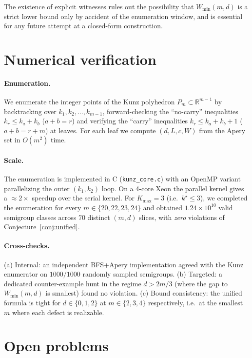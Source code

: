 \documentclass[11pt,a4paper]{article}
\begin{document}
The existence of explicit witnesses rules out the possibility that
$W_{\min}(m,d)$ is a strict lower bound only by accident of the
enumeration window, and is essential for any future attempt at a
closed-form construction.

\section{Numerical verification}
\label{sec:num}

\paragraph{Enumeration.}
We enumerate the integer points of the Kunz polyhedron
$P_m \subset \mathbb{R}^{m-1}$ by backtracking over
$k_1, k_2, ..., k_{m-1}$, forward-checking the ``no-carry''
inequalities $k_r \le k_a + k_b$ ($a+b = r$) and verifying the
``carry'' inequalities $k_r \le k_a + k_b + 1$ ($a+b = r+m$) at
leaves. For each leaf we compute $(d, L, c, W)$ from the
Apery set in $O(m^2)$ time.

\paragraph{Scale.}
The enumeration is implemented in C (\texttt{kunz\_core.c}) with
an OpenMP variant parallelizing the outer
$(k_1, k_2)$ loop. On a 4-core Xeon the parallel kernel gives
a $\approx 2\times$ speedup over the serial kernel. For
$K_{\max} = 3$ (i.e.\ $k^\star \le 3$), we completed the
enumeration for every $m \in \{20, 22, 23, 24\}$ and obtained
$1.24 \times 10^{10}$ valid semigroup classes across
$70$ distinct $(m,d)$ slices, with \emph{zero} violations of
Conjecture~\ref{conj:unified}.

\paragraph{Cross-checks.}
(a) Internal: an independent BFS+Apery implementation agreed with
the Kunz enumerator on $1000/1000$ randomly sampled semigroups.
(b) Targeted: a dedicated counter-example hunt in the regime
$d > 2m/3$ (where the gap to $W_{\min}(m,d)$ is smallest) found
no violation. (c) Bound consistency: the unified formula is
tight for $d \in \{0,1,2\}$ at $m \in \{2,3,4\}$ respectively,
i.e.\ at the smallest $m$ where each defect is realizable.

\section{Open problems}
\end{document}
